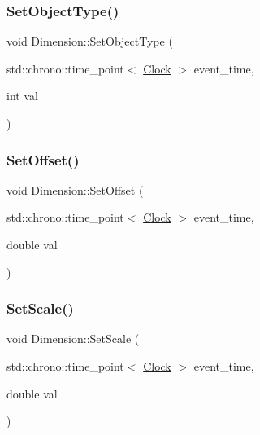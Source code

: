 \mbox{\label{classDimension_a484621a7c6f9b43f6e251ba04e0fdf8b}} 
\subsubsection{\texorpdfstring{Set\+Object\+Type()}{SetObjectType()}}
{\footnotesize\ttfamily void Dimension\+::\+Set\+Object\+Type (\begin{DoxyParamCaption}\item[{std\+::chrono\+::time\+\_\+point$<$ \mbox{\hyperlink{universe_8h_a0ef8d951d1ca5ab3cfaf7ab4c7a6fd80}{Clock}} $>$}]{event\+\_\+time,  }\item[{int}]{val }\end{DoxyParamCaption})}

\mbox{\label{classDimension_af74dd7af3af95c0a51b001b6ad665300}} 
\subsubsection{\texorpdfstring{Set\+Offset()}{SetOffset()}}
{\footnotesize\ttfamily void Dimension\+::\+Set\+Offset (\begin{DoxyParamCaption}\item[{std\+::chrono\+::time\+\_\+point$<$ \mbox{\hyperlink{universe_8h_a0ef8d951d1ca5ab3cfaf7ab4c7a6fd80}{Clock}} $>$}]{event\+\_\+time,  }\item[{double}]{val }\end{DoxyParamCaption})}

\mbox{\label{classDimension_a7f655ea002e8f9614a8c5cfa1807c49c}} 
\subsubsection{\texorpdfstring{Set\+Scale()}{SetScale()}}
{\footnotesize\ttfamily void Dimension\+::\+Set\+Scale (\begin{DoxyParamCaption}\item[{std\+::chrono\+::time\+\_\+point$<$ \mbox{\hyperlink{universe_8h_a0ef8d951d1ca5ab3cfaf7ab4c7a6fd80}{Clock}} $>$}]{event\+\_\+time,  }\item[{double}]{val }\end{DoxyParamCaption})}


